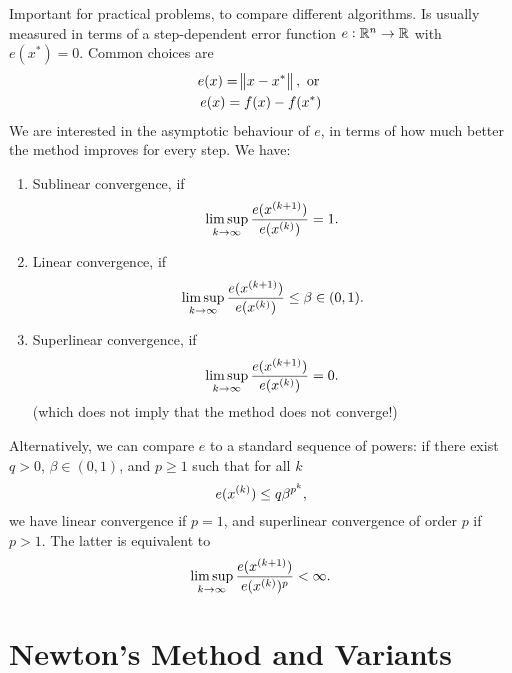 \documentclass{article}
\begin{document}
Important for practical problems, to compare different algorithms.  Is usually measured in terms of
a step-dependent error function \(e: \RR^n \to \RR\) with \(e(x^*) = 0\).  Common choices are
\begin{gather*}
  e(x) = \enVert[1]{x - x^*}, \text{ or } \\
  e(x) = f(x) - f(x^*)
\end{gather*}
We are interested in the asymptotic behaviour of \(e\), in terms of how much better the method
improves for every step.  We have:
\begin{enumerate}
\item Sublinear convergence, if
  \begin{equation*}
    \limsup_{k \to \infty} \frac{e(\kth[k+1]{x})}{e(\kth{x})} = 1.
  \end{equation*}
\item Linear convergence, if
  \begin{equation*}
    \limsup_{k \to \infty}
    \frac{e(\kth[k+1]{x})}{e(\kth{x})} \leq \beta \in (0, 1).
  \end{equation*}
\item Superlinear convergence, if
  \begin{equation*}
    \limsup_{k \to \infty} \frac{e(\kth[k+1]{x})}{e(\kth{x})} = 0.
  \end{equation*}
  (which does not imply that the method does not converge!)
\end{enumerate}
Alternatively, we can compare \(e\) to a standard sequence of powers: if there exist \(q > 0\),
\(\beta \in (0, 1)\), and \(p \geq 1\) such that for all \(k\)
\begin{equation*}
  e(\kth{x}) \leq q \beta^{p^k},
\end{equation*}
we have linear convergence if \(p = 1\), and superlinear convergence of order \(p\) if \(p > 1\).
The latter is equivalent to
\begin{equation*}
  \limsup_{k \to \infty} \frac{e(\kth[k+1]{x})}{e(\kth{x})^p} < \infty.
\end{equation*}


\section{Newton's Method and Variants}

\label{s:newtons-basics}
\end{document}
